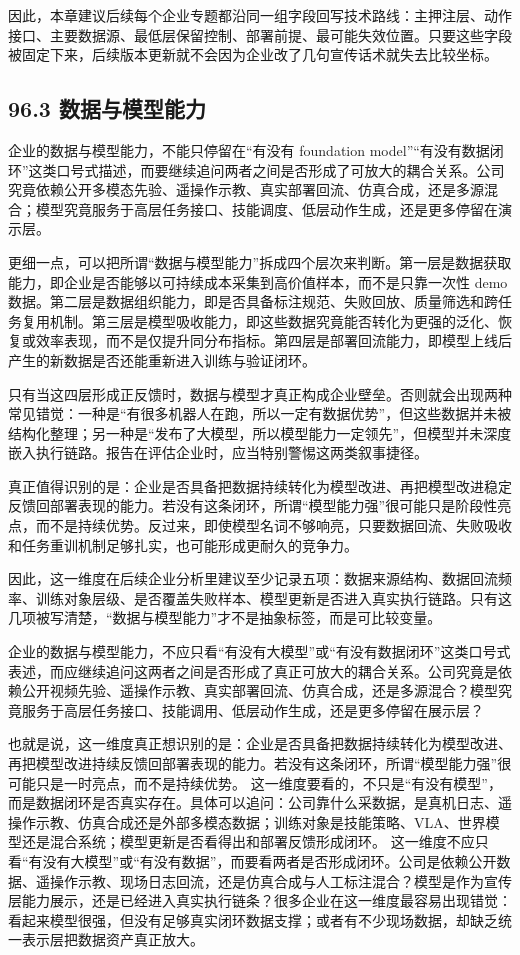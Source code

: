 因此，本章建议后续每个企业专题都沿同一组字段回写技术路线：主押注层、动作接口、主要数据源、最低层保留控制、部署前提、最可能失效位置。只要这些字段被固定下来，后续版本更新就不会因为企业改了几句宣传话术就失去比较坐标。

\subsection*{96.3 数据与模型能力}


企业的数据与模型能力，不能只停留在“有没有 foundation model”“有没有数据闭环”这类口号式描述，而要继续追问两者之间是否形成了可放大的耦合关系。公司究竟依赖公开多模态先验、遥操作示教、真实部署回流、仿真合成，还是多源混合；模型究竟服务于高层任务接口、技能调度、低层动作生成，还是更多停留在演示层。

更细一点，可以把所谓“数据与模型能力”拆成四个层次来判断。第一层是数据获取能力，即企业是否能够以可持续成本采集到高价值样本，而不是只靠一次性 demo 数据。第二层是数据组织能力，即是否具备标注规范、失败回放、质量筛选和跨任务复用机制。第三层是模型吸收能力，即这些数据究竟能否转化为更强的泛化、恢复或效率表现，而不是仅提升同分布指标。第四层是部署回流能力，即模型上线后产生的新数据是否还能重新进入训练与验证闭环。

只有当这四层形成正反馈时，数据与模型才真正构成企业壁垒。否则就会出现两种常见错觉：一种是“有很多机器人在跑，所以一定有数据优势”，但这些数据并未被结构化整理；另一种是“发布了大模型，所以模型能力一定领先”，但模型并未深度嵌入执行链路。报告在评估企业时，应当特别警惕这两类叙事捷径。

真正值得识别的是：企业是否具备把数据持续转化为模型改进、再把模型改进稳定反馈回部署表现的能力。若没有这条闭环，所谓“模型能力强”很可能只是阶段性亮点，而不是持续优势。反过来，即使模型名词不够响亮，只要数据回流、失败吸收和任务重训机制足够扎实，也可能形成更耐久的竞争力。

因此，这一维度在后续企业分析里建议至少记录五项：数据来源结构、数据回流频率、训练对象层级、是否覆盖失败样本、模型更新是否进入真实执行链路。只有这几项被写清楚，“数据与模型能力”才不是抽象标签，而是可比较变量。

企业的数据与模型能力，不应只看“有没有大模型”或“有没有数据闭环”这类口号式表述，而应继续追问这两者之间是否形成了真正可放大的耦合关系。公司究竟是依赖公开视频先验、遥操作示教、真实部署回流、仿真合成，还是多源混合？模型究竟服务于高层任务接口、技能调用、低层动作生成，还是更多停留在展示层？

也就是说，这一维度真正想识别的是：企业是否具备把数据持续转化为模型改进、再把模型改进持续反馈回部署表现的能力。若没有这条闭环，所谓“模型能力强”很可能只是一时亮点，而不是持续优势。 这一维度要看的，不只是“有没有模型”，而是数据闭环是否真实存在。具体可以追问：公司靠什么采数据，是真机日志、遥操作示教、仿真合成还是外部多模态数据；训练对象是技能策略、VLA、世界模型还是混合系统；模型更新是否看得出和部署反馈形成闭环。 这一维度不应只看“有没有大模型”或“有没有数据”，而要看两者是否形成闭环。公司是依赖公开数据、遥操作示教、现场日志回流，还是仿真合成与人工标注混合？模型是作为宣传层能力展示，还是已经进入真实执行链条？很多企业在这一维度最容易出现错觉：看起来模型很强，但没有足够真实闭环数据支撑；或者有不少现场数据，却缺乏统一表示层把数据资产真正放大。

